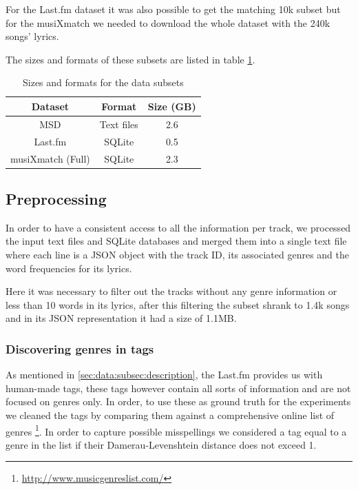 \documentclass[10pt,a4paper]{scrartcl}
\begin{document}
    For the Last.fm dataset it was also possible to get the matching 10k
    subset but for the musiXmatch we needed to download the whole dataset
    with the 240k songs' lyrics.
    
    The sizes and formats of these subsets are listed in table
    \ref{tab:size_subset}.

    \begin{table}
      \center
      \caption{Sizes and formats for the data subsets}
      \begin{tabular}{|c|c|c|}
      \hline
      Dataset & Format & Size (GB) \\
      \hline
      MSD & Text files & 2.6 \\
      Last.fm & SQLite & 0.5 \\
      musiXmatch (Full) & SQLite & 2.3 \\
      \hline
      \end{tabular}
      \label{tab:size_subset}
    \end{table}

    \subsection{Preprocessing}
      In order to have a consistent access to all the information per track,
      we processed the input text files and SQLite databases and merged them
      into a single text file where each line is a JSON object with the
      track ID, its associated genres and the word frequencies for its
      lyrics.
      
      Here it was necessary to filter out the tracks without any genre information
      or less than 10 words in its lyrics, after this filtering the subset
      shrank to 1.4k songs and in its JSON representation it had a size of 1.1MB.
      
      \subsubsection{Discovering genres in tags}    
        As mentioned in \ref{sec:data:subsec:description}, the Last.fm provides us
        with human-made tags, these tags however contain all sorts of information
        and are not focused on genres only. In order, to use these
        as ground truth for the experiments we cleaned the tags by comparing
        them against a comprehensive online list of genres
        \footnote{\url{http://www.musicgenreslist.com/}}.
        In order to capture possible misspellings we considered a tag equal to
        a genre in the list if their Damerau-Levenshtein distance
        does not exceed 1.
      
\end{document}
